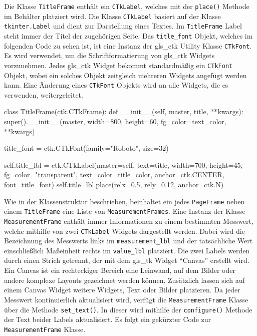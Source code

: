Die Klasse \lstinline{TitleFrame} enthält ein \lstinline{CTkLabel}, welches mit der \lstinline{place()} Methode im Behälter platziert wird. Die Klasse \lstinline{CTkLabel} basiert auf der Klasse \lstinline{tkinter.Label} und dient zur Darstellung eines Textes. Im \lstinline{TitleFrame} Label steht immer der Titel der zugehörigen Seite. Das \lstinline{title_font} Objekt, welches im folgenden Code zu sehen ist, ist eine Instanz der \gls{gls_ctk} Utility Klasse \lstinline{CTkFont}. Es wird verwendet, um die Schriftformatierung von \gls{gls_ctk} Widgets vorzunehmen. Jedes \gls{gls_ctk} Widget bekommt standardmäßig ein \lstinline{CTkFont} Objekt, wobei ein solches Objekt zeitgleich mehreren Widgets angefügt werden kann. Eine Änderung eines \lstinline{CTkFont} Objekts wird an alle Widgets, die es verwenden, weitergeleitet. \cite[vgl.][]{Schimansky:o.J.}

\begin{pythoncode}
class TitleFrame(ctk.CTkFrame):
	def __init__(self, master, title, **kwargs):
		super().__init__(master, width=800, height=60, fg_color=text_color, **kwargs)
		
		title_font = ctk.CTkFont(family="Roboto", size=32)
		
		self.title_lbl = ctk.CTkLabel(master=self, text=title, width=700, height=45, fg_color="transparent", text_color=title_color, anchor=ctk.CENTER, font=title_font)
		self.title_lbl.place(relx=0.5, rely=0.12, anchor=ctk.N)
\end{pythoncode}


Wie in der Klassenstruktur beschrieben, beinhaltet ein jedes \lstinline{PageFrame} neben einem \lstinline{TitleFrame} eine Liste von \lstinline{MeasurementFrames}. Eine Instanz der Klasse \lstinline{MeasurementFrame} enthält immer Informationen zu einem bestimmten Messwert, welche mithilfe von zwei \lstinline{CTkLabel} Widgets dargestellt werden. Dabei wird die Bezeichnung des Messwerts links im \lstinline{measurement_lbl} und der tatsächliche Wert einschließlich Maßeinheit rechts im \lstinline{value_lbl} platziert. Die zwei Labels werden durch einen Strich getrennt, der mit dem \gls{gls_tk} Widget \enquote{Canvas} erstellt wird. Ein Canvas ist ein rechteckiger Bereich \bzw eine Leinwand, auf dem Bilder oder andere komplexe Layouts gezeichnet werden können. Zusätzlich lassen sich auf einem Canvas Widget \zB weitere Widgets, Text oder Bilder platzieren. \cite[vgl.][20]{Shipman:2013} 
\newline Da jeder Messwert kontinuierlich aktualisiert wird, verfügt die \lstinline{MeasurementFrame} Klasse über die Methode \lstinline{set_text()}. In dieser wird mithilfe der \lstinline{configure()} Methode der Text beider Labels aktualisiert. Es folgt ein gekürzter Code zur \lstinline{MeasurementFrame} Klasse.

